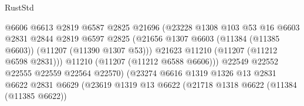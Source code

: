 \begin{lexlean}{RustStd}
\begin{coremodule}
                                            @6606
                                            @6613
                                            @2819
                                            @6587
                                            @2825
                                            @21696
                                            (@23228
                                              @1308
                                              @103
                                              @53
                                              @16
                                              @6603
                                              @2831
                                              @2844
                                              @2819
                                              @6597
                                              @2825
                                              (@21656
                                                @1307
                                                @6603
                                                (@11384 (@11385 @6603))
                                                (@11207 (@11390 @1307 @53)))
                                              @21623
                                              @11210
                                              (@11207 (@11212 @6598 @2831)))
                                            @11210
                                            (@11207 (@11212 @6588 @6606)))
                                          @22549
                                          @22552
                                          @22555
                                          @22559
                                          @22564
                                          @22570)
                                        (@23274
                                          @6616
                                          @1319
                                          @1326
                                          @13
                                          @2831
                                          @6622
                                          @2831
                                          @6629
                                          (@23619
                                            @1319
                                            @13
                                            @6622
                                            (@21718
                                              @1318
                                              @6622
                                              (@11384 (@11385 @6622))

\end{coremodule}
\end{lexlean}
